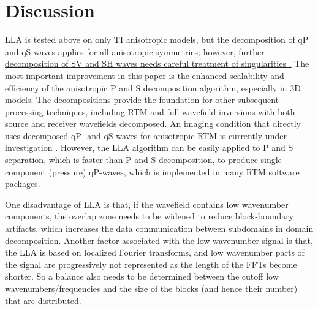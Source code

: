 \documentclass[manuscript,ulem,graphix,revised]{geophysics}
\begin{document}
\section{Discussion}
\indent\indent
\marginnote{[10, 20, 21, 40]}\uline{LLA is tested above on only TI anisotropic models, but the decomposition of qP and qS waves applies for all anisotropic symmetries; however, further decomposition of SV and SH waves needs careful treatment of singularities \mbox{\citep{cheng16, Sripanich16}}.} The most important improvement in this paper is the enhanced scalability and efficiency of the anisotropic P and S decomposition algorithm, especially in 3D models. The decompositions provide the foundation for other subsequent processing techniques, including RTM and full-wavefield inversions with both source and receiver wavefields decomposed. An imaging condition that directly uses decomposed qP- and qS-waves for anisotropic RTM is currently under investigation \marginnote{[33, 41]}\uline{\mbox{\citep[e.g.,][]{wang16}}}. However, the LLA algorithm can be easily applied to P and S separation, which is faster than P and S decomposition, to produce single-component (pressure) qP-waves, which is implemented in many RTM software packages.




One disadvantage of LLA is that, if the wavefield contains low wavenumber components, the overlap zone needs to be widened to reduce block-boundary artifacts, which increases the data communication between subdomains in domain decomposition. Another factor associated with the low wavenumber signal is that, the LLA is based on localized Fourier transforms, and low wavenumber parts of the signal are progressively not represented as the length of the FFTs become shorter. So a balance also needs to be determined between the cutoff low wavenumbers/frequencies and the size of the blocks (and hence their number) that are distributed. 
\end{document}
